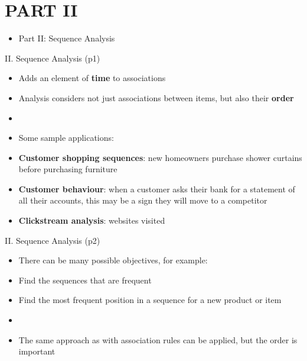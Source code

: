 \documentclass[handout]{beamer}
\newcommand{\strong}[1]{\textbf{\color{teal} #1}}
\begin{document}
\section{PART II}
\begin{frame}{}
\begin{itemize}
\item[] Part II: Sequence Analysis
\end{itemize}
\end{frame}
\begin{frame}{II. Sequence Analysis (p1)}
\begin{itemize}
\item Adds an element of \strong{time} to associations
\item Analysis considers not just associations between items, but also their \strong{order}
\item[]
\item[] Some sample applications:
\item \strong{Customer shopping sequences}: new homeowners purchase shower curtains before purchasing furniture
\item \strong{Customer behaviour}: when a customer asks their bank for a statement of all their accounts, this may be a sign they will move to a competitor
\item \strong{Clickstream analysis}: websites visited %
\end{itemize}
\end{frame}
\begin{frame}{II. Sequence Analysis (p2)}
\begin{itemize}
\item[] There can be many possible objectives, for example:
\item Find the sequences that are frequent
\item Find the most frequent position in a sequence for a new product or item
\item[]
\item The same approach as with association rules can be applied, but the order is important
\end{itemize}
\end{frame}
\end{document}
